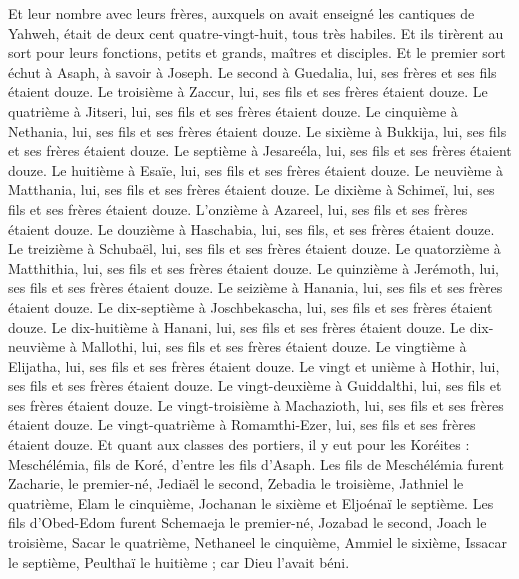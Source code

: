 \begin{multicols}{2}
Et leur nombre avec leurs frères, auxquels on avait enseigné les cantiques de Yahweh, était de deux cent quatre-vingt-huit, tous très habiles.
Et ils tirèrent au sort pour leurs fonctions, petits et grands, maîtres et disciples.
Et le premier sort échut à Asaph, à savoir à Joseph. Le second à Guedalia, lui, ses frères et ses fils étaient douze.
Le troisième à Zaccur, lui, ses fils et ses frères étaient douze.
Le quatrième à Jitseri, lui, ses fils et ses frères étaient douze.
Le cinquième à Nethania, lui, ses fils et ses frères étaient douze.
Le sixième à Bukkija, lui, ses fils et ses frères étaient douze.
Le septième à Jesareéla, lui, ses fils et ses frères étaient douze.
Le huitième à Esaïe, lui, ses fils et ses frères étaient douze.
Le neuvième à Matthania, lui, ses fils et ses frères étaient douze.
Le dixième à Schimeï, lui, ses fils et ses frères étaient douze.
L'onzième à Azareel, lui, ses fils et ses frères étaient douze.
Le douzième à Haschabia, lui, ses fils, et ses frères étaient douze.
Le treizième à Schubaël, lui, ses fils et ses frères étaient douze.
Le quatorzième à Matthithia, lui, ses fils et ses frères étaient douze.
Le quinzième à Jerémoth, lui, ses fils et ses frères étaient douze.
Le seizième à Hanania, lui, ses fils et ses frères étaient douze.
Le dix-septième à Joschbekascha, lui, ses fils et ses frères étaient douze.
Le dix-huitième à Hanani, lui, ses fils et ses frères étaient douze.
Le dix-neuvième à Mallothi, lui, ses fils et ses frères étaient douze.
Le vingtième à Elijatha, lui, ses fils et ses frères étaient douze.
Le vingt et unième à Hothir, lui, ses fils et ses frères étaient douze.
Le vingt-deuxième à Guiddalthi, lui, ses fils et ses frères étaient douze.
Le vingt-troisième à Machazioth, lui, ses fils et ses frères étaient douze.
Le vingt-quatrième à Romamthi-Ezer, lui, ses fils et ses frères étaient douze.
\VerseOne{}Et quant aux classes des portiers, il y eut pour les Koréites : Meschélémia, fils de Koré, d'entre les fils d'Asaph.
Les fils de Meschélémia furent Zacharie, le premier-né, Jediaël le second, Zebadia le troisième, Jathniel le quatrième,
Elam le cinquième, Jochanan le sixième et Eljoénaï le septième.
Les fils d’Obed-Edom furent Schemaeja le premier-né, Jozabad le second, Joach le troisième, Sacar le quatrième, Nethaneel le cinquième,
Ammiel le sixième, Issacar le septième, Peulthaï le huitième ; car Dieu l'avait béni.

\end{multicols}
